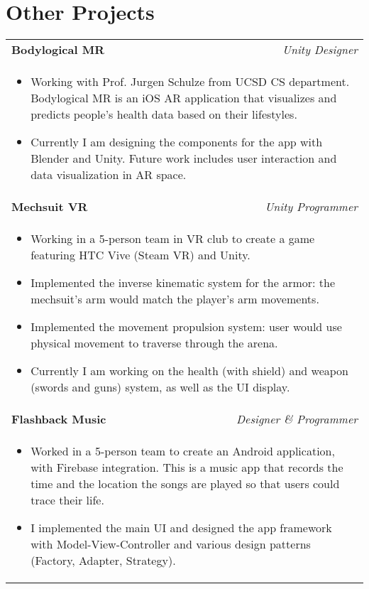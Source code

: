 \documentclass[10pt, letterpaper]{article}
\begin{document}
\section{Other Projects}
\smallskip
\noindent
\begin{tabular}{l r}
\textbf{\large Bodylogical MR} & \textit{Unity Designer} \\
\multicolumn{2}{p{\linewidth}}{
\begin{itemize}
	\item Working with Prof. Jurgen Schulze from UCSD CS department. Bodylogical MR is an iOS AR application that visualizes and predicts people's health data based on their lifestyles. 
	\item Currently I am designing the components for the app with Blender and Unity. Future work includes user interaction and data visualization in AR space.
\end{itemize}
} \\

\textbf{\large Mechsuit VR} & \textit{Unity Programmer} \\
\multicolumn{2}{p{\linewidth}}{
\begin{itemize}
	\item Working in a 5-person team in VR club to create a game featuring HTC Vive (Steam VR) and Unity.
	\item Implemented the inverse kinematic system for the armor: the mechsuit's arm would match the player's arm movements.
	\item Implemented the movement propulsion system: user would use physical movement to traverse through the arena.
	\item Currently I am working on the health (with shield) and weapon (swords and guns) system, as well as the UI display.
\end{itemize}
} \\

\textbf{\large Flashback Music} & \textit{Designer \& Programmer} \\
\multicolumn{2}{p{\linewidth}}{
\begin{itemize}
	\item Worked in a 5-person team to create an Android application, with Firebase integration. This is a music app that records the time and the location the songs are played so that users could trace their life.
	\item I implemented the main UI and designed the app framework with Model-View-Controller and various design patterns (Factory, Adapter, Strategy).
\end{itemize}
} \\


\end{tabular}
\end{document}
